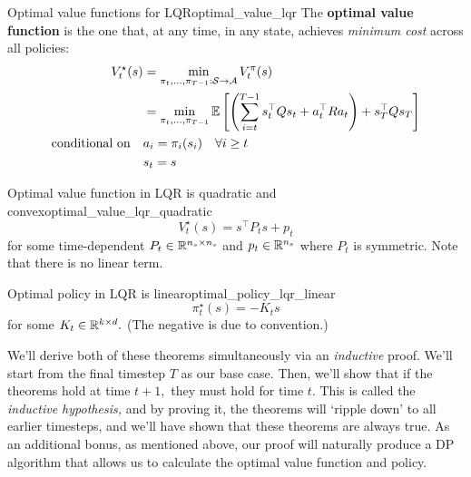 \documentclass[../main/main]{subfiles}
\begin{document}
\begin{definition}[breakable=false]{Optimal value functions for LQR}{optimal_value_lqr}
    The \textbf{optimal value function} is the one that, at any time, in any state,
    achieves \emph{minimum cost} across all policies: \[
        \begin{split}
            V^\star_t(s) &= \min_{\pi_t, \dots, \pi_{T-1} : \mathcal{S} \to \mathcal{A}} V^\pi_t(s) \\
            &= \min_{\pi_{t}, \dots, \pi_{T-1}} \operatorname*{\mathbb{E}} \left[ \left( \sum_{i=t}^{T-1} s_t^\top Q s_t + a_t^\top R a_t \right) + s_T^\top Q s_T \right] \\
            \textrm{conditional on} \quad & a_i = \pi_i(s_i) \quad \forall i \ge t \\
            & s_t = s
        \end{split}
    \]
\end{definition}

\begin{theorem}{Optimal value function in LQR is quadratic and convex}{optimal_value_lqr_quadratic}
    \[
        V^\star_t(s) = s^\top P_t s + p_t
    \]
    for some time-dependent $P_t \in \mathbb{R}^{n_s \times n_s}$ and $p_t \in \mathbb{R}^{n_s}$ where $P_t$ is symmetric. Note that there is no linear term.
\end{theorem}

\begin{theorem}{Optimal policy in LQR is linear}{optimal_policy_lqr_linear}
    \[
        \pi^\star_t (s) = - K_t s
    \]
    for some $K_t \in \mathbb{R}^{k \times d}.$ (The negative is due to convention.)
\end{theorem}





We'll derive both of these theorems simultaneously via an \emph{inductive} proof.
We'll start from the final timestep $T$ as our base case.
Then, we'll show that if the theorems hold at time $t+1,$ they must hold for time $t.$
This is called the \emph{inductive hypothesis,} and by proving it, the theorems will `ripple down' to all earlier timesteps, and we'll have shown that these theorems are always true.
As an additional bonus, as mentioned above, our proof will naturally produce a DP algorithm that allows us to calculate the optimal value function and policy.
\end{document}
